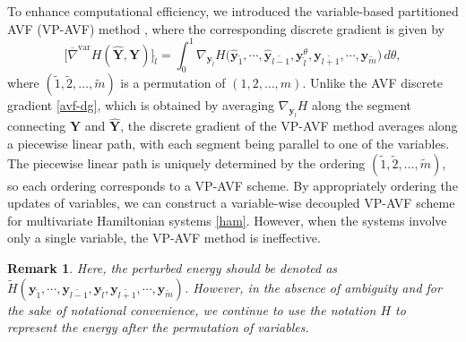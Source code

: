 \documentclass[fleqn,11pt]{elsarticle}
\numberwithin{equation}{section}
\newtheorem{rmk}{Remark}[section]
\begin{document}
To enhance computational efficiency, we introduced the variable-based partitioned AVF (VP-AVF) method \cite{pavf,epavf}, where the corresponding discrete gradient is given by
\begin{equation*}
	\Big[\overline{\nabla}^{\text{var}} H(\widehat{\bm{Y}}, \bm{Y})\Big]_{\widetilde{l}} = \int_0^1 \nabla_{\bm{y}_{\widetilde{l}}} H\big( \widehat{\bm{y}}_{\widetilde{1}}, \cdots, \widehat{\bm{y}}_{\widetilde{l-1}}, \bm{y}_{\widetilde{l}}^\theta, \bm{y}_{\widetilde{l+1}}, \cdots, \bm{y}_{\widetilde{m}} \big) \, d\theta,
\end{equation*}
where $(\widetilde{1}, \widetilde{2}, \ldots, \widetilde{m})$ is a permutation of $(1, 2, \ldots, m)$. Unlike the AVF discrete gradient \eqref{avf-dg}, which is obtained by averaging $\nabla_{\bm{y}_l} H$ along the segment connecting $\bm{Y}$ and $\widehat{\bm{Y}}$, the discrete gradient of the VP-AVF method averages along a piecewise linear path, with each segment being parallel to one of the variables. The piecewise linear path is uniquely determined by the ordering $(\widetilde{1}, \widetilde{2}, \ldots, \widetilde{m})$, so each ordering corresponds to a VP-AVF scheme. By appropriately ordering the updates of variables, we can construct a variable-wise decoupled VP-AVF scheme for multivariate Hamiltonian systems \eqref{ham}. However, when the systems involve only a single variable, the VP-AVF method is ineffective.

\begin{rmk}
	Here, the perturbed energy should be denoted as $\widetilde{H}({\bm{y}}_{\widetilde{1}}, \cdots, {\bm{y}}_{\widetilde{l-1}}, {\bm{y}}_{\widetilde{l}}, \bm{y}_{\widetilde{l+1}}, \cdots, \bm{y}_{\widetilde{m}})$. However, in the absence of ambiguity and for the sake of notational convenience, we continue to use the notation $H$ to represent the energy after the permutation of variables. 
\end{rmk}
\end{document}
